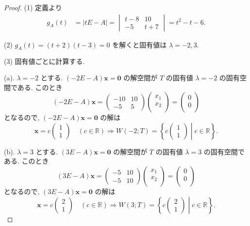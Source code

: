 \documentclass[dvipdfmx,a4paper,11pt]{article} %
\theoremstyle{definition}
\begin{document}
\begin{proof}
(1) 定義より
\[
\begin{aligned}
g_A(t)
&=\lvert tE-A\rvert=
\begin{vmatrix}
t-8&10\\
-5&t+7
\end{vmatrix}=t^2-t-6.
\end{aligned}
\]

(2)
\(
g_A(t)=(t+2)(t-3)=0
\)
を解くと固有値は
\(
\lambda=-2,3.
\)

(3) 固有値ごとに計算する. 

(a). $\lambda=-2$ とする. $(-2E-A)\bm{x}=\bm{0}$ の解空間が $T$ の固有値 $\lambda=-2$ の固有空間である. このとき
\[
(-2E-A)\bm{x}=
\begin{pmatrix}
-10&10\\
-5&5
\end{pmatrix}
\begin{pmatrix}
x_1\\
x_2\\
\end{pmatrix}
=
\begin{pmatrix}
0\\
0\\
\end{pmatrix}
\]
となるので, $(-2E-A)\bm{x}=\bm{0}$ の解は
\[
\bm{x}=c
\begin{pmatrix}
1\\
1
\end{pmatrix}
\quad(c\in\mathbb{R})
\Rightarrow
W(-2;T)
=
\left\{
c
\begin{pmatrix}
1\\
1
\end{pmatrix}
\mathrel{}\middle|\mathrel{}
c\in\mathbb{R}
\right\}.
\]

(b). $\lambda=3$ とする.
$(3E-A)\bm{x}=\bm{0}$ の解空間が $T$ の固有値 $\lambda=3$ の固有空間である. このとき
\[
(3E-A)\bm{x}=
\begin{pmatrix}
-5&10\\
-5&10
\end{pmatrix}
\begin{pmatrix}
x_1\\
x_2\\
\end{pmatrix}
=
\begin{pmatrix}
0\\
0\\
\end{pmatrix}
\]
となるので, $(3E-A)\bm{x}=\bm{0}$ の解は
\[
\bm{x}=c
\begin{pmatrix}
2\\
1
\end{pmatrix}
\quad(c\in\mathbb{R})
\Rightarrow
W(3;T)
=
\left\{
c
\begin{pmatrix}
2\\
1
\end{pmatrix}
\mathrel{}\middle|\mathrel{}
c\in\mathbb{R}
\right\}.
\]
\end{proof}
\end{document}
